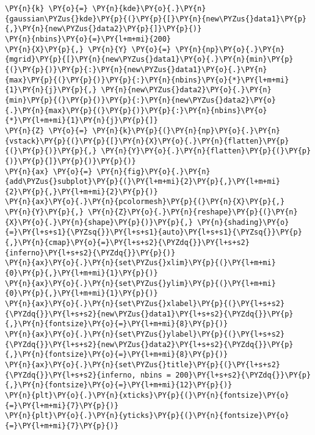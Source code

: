 \begin{tcolorbox}[breakable, size=fbox, boxrule=1pt, pad at break*=1mm,colback=cellbackground, colframe=cellborder]
\begin{Verbatim}[commandchars=\\\{\}]
\PY{n}{k} \PY{o}{=} \PY{n}{kde}\PY{o}{.}\PY{n}{gaussian\PYZus{}kde}\PY{p}{(}\PY{p}{[}\PY{n}{new\PYZus{}data1}\PY{p}{,}\PY{n}{new\PYZus{}data2}\PY{p}{]}\PY{p}{)}
\PY{n}{nbins}\PY{o}{=}\PY{l+m+mi}{200}
\PY{n}{X}\PY{p}{,} \PY{n}{Y} \PY{o}{=} \PY{n}{np}\PY{o}{.}\PY{n}{mgrid}\PY{p}{[}\PY{n}{new\PYZus{}data1}\PY{o}{.}\PY{n}{min}\PY{p}{(}\PY{p}{)}\PY{p}{:}\PY{n}{new\PYZus{}data1}\PY{o}{.}\PY{n}{max}\PY{p}{(}\PY{p}{)}\PY{p}{:}\PY{n}{nbins}\PY{o}{*}\PY{l+m+mi}{1}\PY{n}{j}\PY{p}{,} \PY{n}{new\PYZus{}data2}\PY{o}{.}\PY{n}{min}\PY{p}{(}\PY{p}{)}\PY{p}{:}\PY{n}{new\PYZus{}data2}\PY{o}{.}\PY{n}{max}\PY{p}{(}\PY{p}{)}\PY{p}{:}\PY{n}{nbins}\PY{o}{*}\PY{l+m+mi}{1}\PY{n}{j}\PY{p}{]}
\PY{n}{Z} \PY{o}{=} \PY{n}{k}\PY{p}{(}\PY{n}{np}\PY{o}{.}\PY{n}{vstack}\PY{p}{(}\PY{p}{[}\PY{n}{X}\PY{o}{.}\PY{n}{flatten}\PY{p}{(}\PY{p}{)}\PY{p}{,} \PY{n}{Y}\PY{o}{.}\PY{n}{flatten}\PY{p}{(}\PY{p}{)}\PY{p}{]}\PY{p}{)}\PY{p}{)}
\PY{n}{ax} \PY{o}{=} \PY{n}{fig}\PY{o}{.}\PY{n}{add\PYZus{}subplot}\PY{p}{(}\PY{l+m+mi}{2}\PY{p}{,}\PY{l+m+mi}{2}\PY{p}{,}\PY{l+m+mi}{2}\PY{p}{)}
\PY{n}{ax}\PY{o}{.}\PY{n}{pcolormesh}\PY{p}{(}\PY{n}{X}\PY{p}{,} \PY{n}{Y}\PY{p}{,} \PY{n}{Z}\PY{o}{.}\PY{n}{reshape}\PY{p}{(}\PY{n}{X}\PY{o}{.}\PY{n}{shape}\PY{p}{)}\PY{p}{,} \PY{n}{shading}\PY{o}{=}\PY{l+s+s1}{\PYZsq{}}\PY{l+s+s1}{auto}\PY{l+s+s1}{\PYZsq{}}\PY{p}{,}\PY{n}{cmap}\PY{o}{=}\PY{l+s+s2}{\PYZdq{}}\PY{l+s+s2}{inferno}\PY{l+s+s2}{\PYZdq{}}\PY{p}{)}
\PY{n}{ax}\PY{o}{.}\PY{n}{set\PYZus{}xlim}\PY{p}{(}\PY{l+m+mi}{0}\PY{p}{,}\PY{l+m+mi}{1}\PY{p}{)}
\PY{n}{ax}\PY{o}{.}\PY{n}{set\PYZus{}ylim}\PY{p}{(}\PY{l+m+mi}{0}\PY{p}{,}\PY{l+m+mi}{1}\PY{p}{)}
\PY{n}{ax}\PY{o}{.}\PY{n}{set\PYZus{}xlabel}\PY{p}{(}\PY{l+s+s2}{\PYZdq{}}\PY{l+s+s2}{new\PYZus{}data1}\PY{l+s+s2}{\PYZdq{}}\PY{p}{,}\PY{n}{fontsize}\PY{o}{=}\PY{l+m+mi}{8}\PY{p}{)}
\PY{n}{ax}\PY{o}{.}\PY{n}{set\PYZus{}ylabel}\PY{p}{(}\PY{l+s+s2}{\PYZdq{}}\PY{l+s+s2}{new\PYZus{}data2}\PY{l+s+s2}{\PYZdq{}}\PY{p}{,}\PY{n}{fontsize}\PY{o}{=}\PY{l+m+mi}{8}\PY{p}{)}
\PY{n}{ax}\PY{o}{.}\PY{n}{set\PYZus{}title}\PY{p}{(}\PY{l+s+s2}{\PYZdq{}}\PY{l+s+s2}{inferno, nbins = 200}\PY{l+s+s2}{\PYZdq{}}\PY{p}{,}\PY{n}{fontsize}\PY{o}{=}\PY{l+m+mi}{12}\PY{p}{)}
\PY{n}{plt}\PY{o}{.}\PY{n}{xticks}\PY{p}{(}\PY{n}{fontsize}\PY{o}{=}\PY{l+m+mi}{7}\PY{p}{)}
\PY{n}{plt}\PY{o}{.}\PY{n}{yticks}\PY{p}{(}\PY{n}{fontsize}\PY{o}{=}\PY{l+m+mi}{7}\PY{p}{)}


\end{Verbatim}
\end{tcolorbox}
